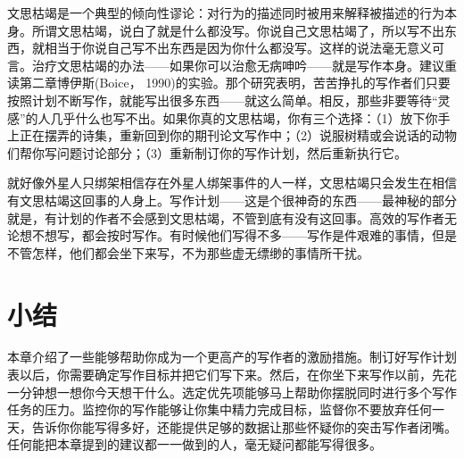 文思枯竭是一个典型的倾向性谬论：对行为的描述同时被用来解释被描述的行为本身。所谓文思枯竭，说白了就是什么都没写。你说自己文思枯竭了，所以写不出东西，就相当于你说自己写不出东西是因为你什么都没写。这样的说法毫无意义可言。治疗文思枯竭的办法——如果你可以治愈无病呻吟——就是写作本身。建议重读第二章博伊斯(Boice， 1990)的实验。那个研究表明，苦苦挣扎的写作者们只要按照计划不断写作，就能写出很多东西——就这么简单。相反，那些非要等待“灵感”的人几乎什么也写不出。如果你真的文思枯竭，你有三个选择：（1）放下你手上正在摆弄的诗集，重新回到你的期刊论文写作中；（2）说服树精或会说话的动物们帮你写问题讨论部分；（3）重新制订你的写作计划，然后重新执行它。

就好像外星人只绑架相信存在外星人绑架事件的人一样，文思枯竭只会发生在相信有文思枯竭这回事的人身上。写作计划——这是个很神奇的东西——最神秘的部分就是，有计划的作者不会感到文思枯竭，不管到底有没有这回事。高效的写作者无论想不想写，都会按时写作。有时候他们写得不多——写作是件艰难的事情，但是不管怎样，他们都会坐下来写，不为那些虚无缥缈的事情所干扰。

\section{小结}
本章介绍了一些能够帮助你成为一个更高产的写作者的激励措施。制订好写作计划表以后，你需要确定写作目标并把它们写下来。然后，在你坐下来写作以前，先花一分钟想一想你今天想干什么。选定优先项能够马上帮助你摆脱同时进行多个写作任务的压力。监控你的写作能够让你集中精力完成目标，监督你不要放弃任何一天，告诉你你能写得多好，还能提供足够的数据让那些怀疑你的突击写作者闭嘴。任何能把本章提到的建议都一一做到的人，毫无疑问都能写得很多。